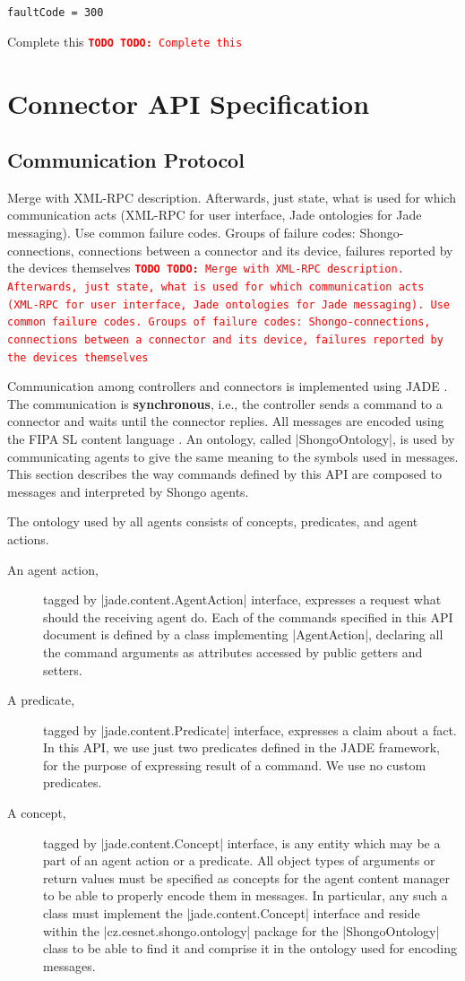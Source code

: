 \documentclass[a4paper]{report}
\newcommand{\ApiCode}[1]{\lstinline[style=styleApi]|#1|}
\newcommand{\ApiItem}[1]{\item #1 %

}
\newenvironment{ApiFailures}{\begin{compactitem}}{\end{compactitem}}
\newcommand{\ApiFailure}[1]{\ApiItem{\ApiCode{faultCode = #1}}}
\newcommand{\TODO}[1]{%
\def\empty{}%
\def\prvniparametr{#1}%
\ifx\prvniparametr\empty%
\begingroup\tt\textcolor{red}{\noindent\textbf{TODO}}\endgroup
\else%
\begingroup\tt\textcolor{red}{\noindent\textbf{TODO:}\ #1}\endgroup
\fi%
}
\begin{document}
\begin{ApiFailures}
\ApiFailure{300}
\end{ApiFailures}
\TODO{Complete this}


\chapter{Connector API Specification}

\section{Communication Protocol}

\TODO{Merge with XML-RPC description. Afterwards, just state, what is used for which communication acts (XML-RPC for user interface, Jade ontologies for Jade messaging). Use common failure codes. Groups of failure codes: Shongo-connections, connections between a connector and its device, failures reported by the devices themselves}

Communication among controllers and connectors is implemented using JADE \cite{jade}. The communication is \textbf{synchronous}, i.e., the controller sends a command to a connector and waits until the connector replies. All messages are encoded using the FIPA SL content language \cite{FIPA-SL}. An ontology, called |ShongoOntology|, is used by communicating agents to give the same meaning to the symbols used in messages. This section describes the way commands defined by this API are composed to messages and interpreted by Shongo agents.

The ontology used by all agents consists of concepts, predicates, and agent actions.
\begin{description}
\item[An agent action,] tagged by |jade.content.AgentAction| interface, expresses a request what should the receiving agent do. Each of the commands specified in this API document is defined by a class implementing |AgentAction|, declaring all the command arguments as attributes accessed by public getters and setters.
\item[A predicate,] tagged by |jade.content.Predicate| interface, expresses a claim about a fact. In this API, we use just two predicates defined in the JADE framework, for the purpose of expressing result of a command. We use no custom predicates.
\item[A concept,] tagged by |jade.content.Concept| interface, is any entity which may be a part of an agent action or a predicate. All object types of arguments or return values must be specified as concepts for the agent content manager to be able to properly encode them in messages. In particular, any such a class must implement the |jade.content.Concept| interface and reside within the |cz.cesnet.shongo.ontology| package for the |ShongoOntology| class to be able to find it and comprise it in the ontology used for encoding messages.
\end{description}
\end{document}
